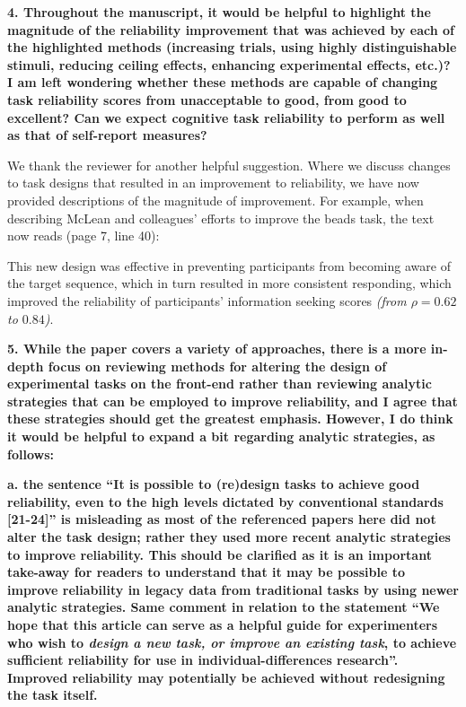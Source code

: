 \documentclass[a4paper,12pt]{article}
\begin{document}
\textbf{4. Throughout the manuscript, it would be helpful to highlight the magnitude of the reliability improvement that was achieved by each of the highlighted methods (increasing trials, using highly distinguishable stimuli, reducing ceiling effects, enhancing experimental effects, etc.)? I am left wondering whether these methods are capable of changing task reliability scores from unacceptable to good, from good to excellent? Can we expect cognitive task reliability to perform as well as that of self-report measures?}

We thank the reviewer for another helpful suggestion. Where we discuss changes to task designs that resulted in an improvement to reliability, we have now provided descriptions of the magnitude of improvement. For example, when describing McLean and colleagues' efforts to improve the beads task, the text now reads (page 7, line 40):

\begin{displayquote}
    This new design was effective in preventing participants from becoming aware of the target sequence, which in turn resulted in more consistent responding, which improved the reliability of participants' information seeking scores \textit{(from $\rho = 0.62$ to $0.84$)}. 
\end{displayquote}

\textbf{5. While the paper covers a variety of approaches, there is a more in-depth focus on reviewing methods for altering the design of experimental tasks on the front-end rather than reviewing analytic strategies that can be employed to improve reliability, and I agree that these strategies should get the greatest emphasis. However, I do think it would be helpful to expand a bit regarding analytic strategies, as follows:}

\textbf{a. the sentence ``It is possible to (re)design tasks to achieve good reliability, even to the high levels dictated by conventional standards [21-24]'' is misleading as most of the referenced papers here did not alter the task design; rather they used more recent analytic strategies to improve reliability. This should be clarified as it is an important take-away for readers to understand that it may be possible to improve reliability in legacy data from traditional tasks by using newer analytic strategies. Same comment in relation to the statement ``We hope that this article can serve as a helpful guide for experimenters who wish to \textit{design a new task, or improve an existing task}, to achieve sufficient reliability for use in individual-differences research''. Improved reliability may potentially be achieved without redesigning the task itself.}
\end{document}
